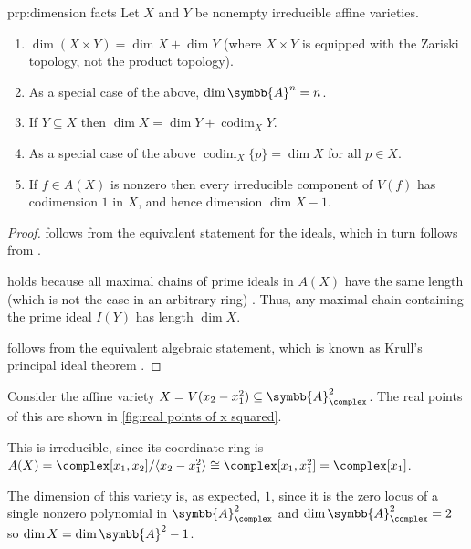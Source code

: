 \documentclass[fleqn]{NotesClass}
\newcommand{\affine}{\symbb{A}}
\newcommand{\isomorphic}{\cong}
\DeclareMathOperator{\codim}{codim}
\begin{document}
    \begin{prp}{}{prp:dimension facts}
        Let \(X\) and \(Y\) be nonempty irreducible affine varieties.
        \begin{enumerate}
            \item \label{itm:dim product is sum dims}\(\dim (X \times Y) = \dim X + \dim Y\) (where \(X \times Y\) is equipped with the Zariski topology, not the product topology).
            \item As a special case of the above, \(\dim \affine^n = n\).
            \item \label{itm:dim is dim plus codim}If \(Y \subseteq X\) then \(\dim X = \dim Y + \codim_X Y\).
            \item As a special case of the above \(\codim_X \{p\} = \dim X\) for all \(p \in X\).
            \item \label{itm:irreducible components of V(f) have codim 1}If \(f \in A(X)\) is nonzero then every irreducible component of \(V(f)\) has codimension \(1\) in \(X\), and hence dimension \(\dim X - 1\).
        \end{enumerate}
        \begin{proof}
             follows from the equivalent statement for the ideals, which in turn follows from \cite[Ex 11.33]{gathmann.comm.alg}.
            
             holds because all maximal chains of prime ideals in \(A(X)\) have the same length (which is not the case in an arbitrary ring) \cite[Crl 11.12]{gathmann.comm.alg}.
            Thus, any maximal chain containing the prime ideal \(I(Y)\) has length \(\dim X\).
            
             follows from the equivalent algebraic statement, which is known as Krull's principal ideal theorem \cite[Prop 11.15]{gathmann.comm.alg}.
        \end{proof}
    \end{prp}
    
    \begin{exm}{}{}
        Consider the affine variety \(X = V(x_2 - x_1^2) \subseteq \affine_{\complex}^2\).
        The real points of this are shown in \cref{fig:real points of x squared}.
        
        This is irreducible, since its coordinate ring is \(A(X) = \complex[x_1, x_2] / \langle x_2 - x_1^2 \rangle \isomorphic \complex[x_1, x_1^2] = \complex[x_1]\).
        
        The dimension of this variety is, as expected, \(1\), since it is the zero locus of a single nonzero polynomial in \(\affine_{\complex}^2\) and \(\dim \affine_{\complex}^2 = 2\) so \(\dim X = \dim \affine^2 - 1\).
    \end{exm}
    
\end{document}
